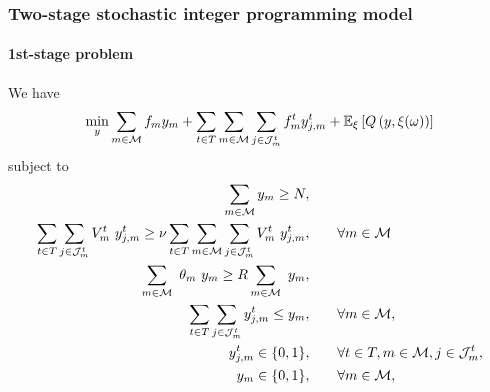 \documentclass[9pt,xcolor={dvipsnames}]{beamer}
\begin{document}
\begin{frame}[allowframebreaks]
	\frametitle{Two-stage stochastic integer programming model}
	\framesubtitle{1st-stage problem}
	We have
	\bigskip
	{
	\footnotesize
	\begin{equation}
		\label{2s:objf}
		\min_{y} \sum\limits_{m \in \cal M} {f_{m}}y_{m} +  \sum\limits_{t \in T} \sum\limits_{m \in {{\cal M}}} \sum\limits_{j \in {\cal J}_{m}^t} f_{m}^t y_{j,m}^t  + {\mathbb{E}}_{\xi}\left[Q \left(y,\xi(\omega)\right)\right] 
	\end{equation}
	\noindent subject to
	\begin{alignat}{2}
		\sum\limits_{m \in \cal {M}} y_{m}\geq{N}, & \qquad
		\label{eq3}\\
		\sum\limits_{t \in T} \sum\limits_{j \in {\cal J}^t_{m}} V_{m}^{t} \ y_{j,m}^{t} \geq \nu \sum\limits_{t \in T} \sum\limits_{m \in {\cal M}} \sum\limits_{j \in {\cal J}^t_{m}} V_{m}^{t} \ y_{j,m}^{t}, & \qquad \forall m \in {\cal M}
		\label{eq3.2}\\
		\sum\limits_{m \in {{\cal M}}} \ \theta_{m} \ y_{m}  \geq {R} \sum\limits_{m \in {\cal M}} \ y_{m}, & \qquad \label{eq4}\\
		\sum\limits_{t \in T} \sum\limits_{j \in {\cal J}^t_{m}} y_{j,m}^{t} \leq y_{m}, & \qquad \forall m \in \cal M, \label{eq5}\\
		y_{j,m}^t \in \{0, 1\}, & \qquad \forall t \in T, m \in {\cal M}, j \in {\cal J}^t_{m}, \label{eq6}\\
		y_{m} \in \{0, 1\}, & \qquad \forall m \in \cal M \label{eq7},
	\end{alignat}
	}
\end{frame}
\end{document}
